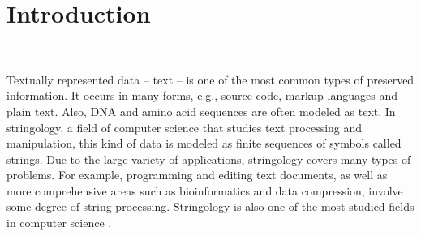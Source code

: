 \documentclass[english,twoside,censored,csm,algorithms-track-2020]{HYthesisML}
\theoremstyle{plain}
\theoremstyle{definition}
\begin{document}
\mainmatter


%
%
%
%



\chapter{Introduction}~\label{chp-intro}


Textually represented data -- text -- is one of the most common types of preserved information.
It occurs in many forms, e.g., source code, markup languages and plain text.
Also, DNA and amino acid sequences are often modeled as text.
In stringology, a field of computer science that studies text processing and manipulation,
this kind of data is modeled as finite sequences of symbols called strings.
Due to the large variety of applications, stringology covers many types of problems.
For example, programming and editing text documents, as well as more comprehensive areas such as
bioinformatics and data compression, involve some degree of string processing.
Stringology is also one of the most studied fields in computer science \citep{Crochemore03}.
\end{document}
